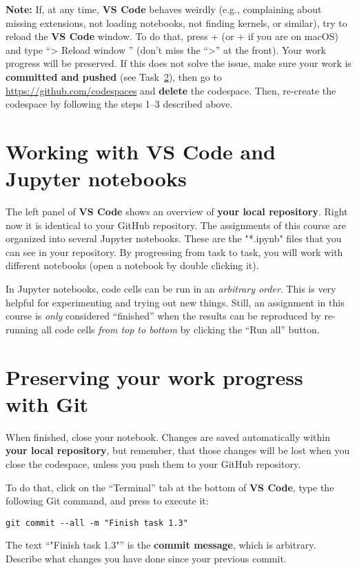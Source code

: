 \documentclass[12pt,a4paper]{article}
\begin{document}
\textbf{Note:} If, at any time, \textbf{VS Code} behaves weirdly (e.g., complaining about missing extensions, not loading notebooks, not finding kernels, or similar), try to reload the \textbf{VS Code} window. To do that, press \Ctrl+ (or \keystroke{\cmd}+ if you are on macOS) and type ``> Reload window \Return'' (don't miss the ``>'' at the front). Your work progress will be preserved. If this does not solve the issue, make sure your work is \textbf{committed and pushed} (see Task~\ref{task:git}), then go to \url{https://github.com/codespaces} and \textbf{delete} the codespace. Then, re-create the codespace by following the steps 1--3 described above.

\section{Working with VS Code and Jupyter notebooks}
\label{task:jupyter}

The left panel of \textbf{VS Code} shows an overview of \textbf{your local repository}. Right now it is identical to your GitHub repository. The assignments of this course are organized into several Jupyter notebooks. These are the "*.ipynb" files that you can see in your repository. By progressing from task to task, you will work with different notebooks (open a notebook by double clicking it).

In Jupyter notebooks, code cells can be run in an \emph{arbitrary order}. This is very helpful for experimenting and trying out new things. Still, an assignment in this course is \emph{only} considered ``finished'' when the results can be reproduced by re-running all code cells \emph{from top to bottom} by clicking the ``Run all'' button.

\section{Preserving your work progress with Git}
\label{task:git}

When finished, close your notebook. Changes are saved automatically within \textbf{your local repository}, but remember, that those changes will be lost when you close the codespace, unless you push them to your GitHub repository.

To do that, click on the ``Terminal'' tab at the bottom of \textbf{VS Code}, type the following Git command, and press \Return to execute it:
\begin{Verbatim}[frame=single]
git commit --all -m "Finish task 1.3"
\end{Verbatim}
The text ``"Finish task 1.3"'' is the \textbf{commit message}, which is arbitrary. Describe what changes you have done since your previous commit.
\end{document}
